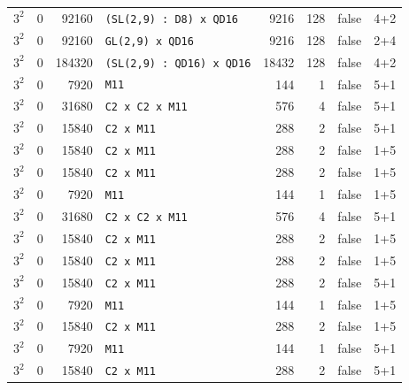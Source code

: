 \begin{longtable}{llrlrrll}
$3^2$ & 0 & 92160 & \texttt{(SL(2,9) : D8) x QD16} & 9216 & 128 & false & 4+2\\
$3^2$ & 0 & 92160 & \texttt{GL(2,9) x QD16} & 9216 & 128 & false & 2+4\\
$3^2$ & 0 & 184320 & \texttt{(SL(2,9) : QD16) x QD16} & 18432 & 128 & false & 4+2\\
$3^2$ & 0 & 7920 & \texttt{M11} & 144 & 1 & false & 5+1\\
$3^2$ & 0 & 31680 & \texttt{C2 x C2 x M11} & 576 & 4 & false & 5+1\\
$3^2$ & 0 & 15840 & \texttt{C2 x M11} & 288 & 2 & false & 5+1\\
$3^2$ & 0 & 15840 & \texttt{C2 x M11} & 288 & 2 & false & 1+5\\
$3^2$ & 0 & 15840 & \texttt{C2 x M11} & 288 & 2 & false & 1+5\\
$3^2$ & 0 & 7920 & \texttt{M11} & 144 & 1 & false & 1+5\\
$3^2$ & 0 & 31680 & \texttt{C2 x C2 x M11} & 576 & 4 & false & 5+1\\
$3^2$ & 0 & 15840 & \texttt{C2 x M11} & 288 & 2 & false & 1+5\\
$3^2$ & 0 & 15840 & \texttt{C2 x M11} & 288 & 2 & false & 1+5\\
$3^2$ & 0 & 15840 & \texttt{C2 x M11} & 288 & 2 & false & 5+1\\
$3^2$ & 0 & 7920 & \texttt{M11} & 144 & 1 & false & 1+5\\
$3^2$ & 0 & 15840 & \texttt{C2 x M11} & 288 & 2 & false & 1+5\\
$3^2$ & 0 & 7920 & \texttt{M11} & 144 & 1 & false & 5+1\\
$3^2$ & 0 & 15840 & \texttt{C2 x M11} & 288 & 2 & false & 5+1\\
\end{longtable}
